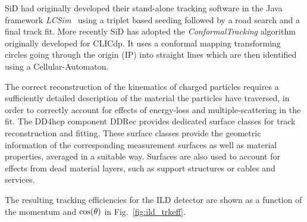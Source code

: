 SiD had originally developed their stand-alone tracking software in the Java framework \emph{LCSim}~\cite{bib:LCSim}
using a triplet based seeding followed by a road search and a final track fit. More recently SiD has adopted the \emph{ConformalTracking}
algorithm originally developed for CLICdp. It uses a conformal mapping transforming circles going through the origin (IP)
into straight lines which are then identified using a Cellular-Automaton.

The correct reconstruction of the kinematics of charged particles requires a sufficiently detailed description of the material
the particles have traversed, in order to correctly account for effects of energy-loss and multiple-scattering in the fit.
The DD4hep component DDRec provides dedicated surface classes for track reconstruction and fitting. These surface classes provide the
geometric information of the corresponding measurement surfaces as well as material properties, averaged in a suitable way. Surfaces
are also used to account for effects from dead material layers, such as support structures or cables and services.


The resulting tracking efficiencies for the ILD detector are shown as a function of the momentum and
$\rm{cos}(\theta)$ in Fig.~\ref{fig:ild_trkeff}.

